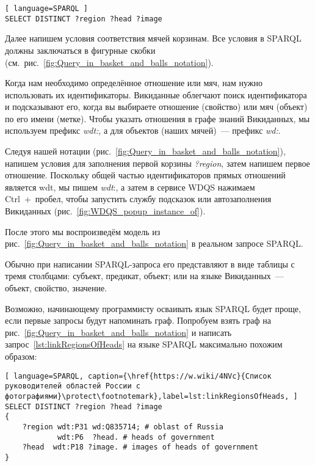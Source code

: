 \begin{lstlisting}[ language=SPARQL ]
SELECT DISTINCT ?region ?head ?image
\end{lstlisting}

Далее напишем условия соответствия мячей корзинам. 
Все условия в SPARQL должны заключаться в фигурные скобки (см.~рис.~\ref{fig:Query_in_basket_and_balls_notation}).

Когда нам необходимо определённое отношение или мяч, нам нужно использовать их идентификаторы. 
Викиданные облегчают поиск идентификатора и подсказывают его, 
когда вы выбираете отношение (свойство) или мяч (объект) по его имени (метке). 
Чтобы указать отношения в графе знаний Викиданных, 
мы используем префикс \textit{wdt:}, а для объектов (наших мячей)~--- префикс \textit{wd:}.

Следуя нашей нотации (рис.~\ref{fig:Query_in_basket_and_balls_notation}), 
напишем условия для заполнения первой корзины \textit{?region}, затем напишем первое отношение. 
Поскольку общей частью идентификаторов прямых отношений является wdt, мы пишем \textit{wdt}:, 
а затем в сервисе WDQS нажимаем Ctrl~+~пробел, чтобы запустить службу подсказок или  автозаполнения Викиданных (рис.~\ref{fig:WDQS_popup_instance_of}).

\begin{marginfigure}[0cm]
	{
		\setlength{\fboxsep}{0pt}%
		\setlength{\fboxrule}{1pt}%
	}
    \caption[Меню автозаполнения свойства Викиданых в сервисе WDQS.]{С помощью команды Ctrl~+~пробел открылось выпадающее контекстное меню автозаполнения свойства Викиданых}
	\label{fig:WDQS_popup_instance_of}
\end{marginfigure}

После этого мы воспроизведём модель из рис.~\ref{fig:Query_in_basket_and_balls_notation} в реальном запросе SPARQL.

Обычно при написании SPARQL-запроса его представляют в виде таблицы с тремя столбцами: 
субъект, предикат, объект; 
или на языке Викиданных~--- объект, свойство, значение.

Возможно, начинающему программисту осваивать язык SPARQL будет проще, 
если первые запросы будут напоминать граф. 
Попробуем взять граф на рис.~\ref{fig:Query_in_basket_and_balls_notation} 
и написать запрос~\ref{lst:linkRegionsOfHeads} на языке SPARQL максимально похожим образом:

\begin{lstlisting}[ language=SPARQL, caption={\href{https://w.wiki/4NVc}{Список руководителей областей России с фотографиями}\protect\footnotemark},label=lst:linkRegionsOfHeads, ]
SELECT DISTINCT ?region ?head ?image
{
    ?region wdt:P31 wd:Q835714; # oblast of Russia
            wdt:P6  ?head. # heads of government
    ?head  wdt:P18 ?image. # images of heads of government
}
\end{lstlisting}




